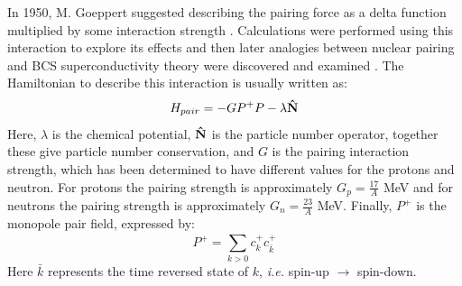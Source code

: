 In 1950, M. Goeppert suggested describing the pairing force as a delta function multiplied by some interaction strength \cite{pairingFirstTheory}. Calculations were performed using this interaction to explore its effects \cite{pairingCorrEffectOnProperties} and then later analogies between nuclear pairing and BCS superconductivity theory \cite{bcsTheory} were discovered and examined \cite{pairingAnalogyToBCS,pairingSuperfluidity}. The Hamiltonian to describe this interaction is usually written as:
\begin{equation}
\label{eqn:chp2-pairing-hamil}
H_{pair} = -GP^+P-\lambda{}\boldsymbol{\hat{\textbf{N}}}
\end{equation}
Here, $\lambda$ is the chemical potential, $\boldsymbol{\hat{\textbf{N}}}$ is the particle number operator, together these give particle number conservation, and $G$ is the pairing interaction strength, which has been determined to have different values for the protons and neutron. For protons the pairing strength is approximately $G_p=\frac{17}{A}$ MeV and for neutrons the pairing strength is approximately $G_n=\frac{23}{A}$ MeV. Finally, $P^+$ is the monopole pair field, expressed by:
\begin{equation}
\label{eqn:chp2-monopole-pair-op}
P^+=\sum\limits_{k>0}^{}c^+_kc^+_{\bar{k}}
\end{equation}
Here $\bar{k}$ represents the time reversed state of $k$, \emph{i.e.} spin-up $\rightarrow$ spin-down.

